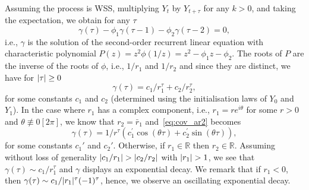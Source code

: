 \documentclass[11pt]{article}
\DeclarePairedDelimiter\abs{|}{|}
\begin{document}
\begin{solution}  %
Assuming the process is WSS, multiplying $Y_t$ by $Y_{t+\tau}$ for any $k>0$, and taking the expectation, we obtain for any $\tau$
%
\begin{equation}
    \gamma(\tau)-\phi_1\gamma(\tau-1)-\phi_2\gamma(\tau-2) = 0,
\end{equation}
%
i.e., $\gamma$ is the solution of the second-order recurrent linear equation with characteristic polynomial $P(z) = z^2\phi(1/z) = z^2-\phi_1z-\phi_2$. The roots of $P$ are the inverse of the roots of $\phi$, i.e., $1/r_1$ and $1/r_2$ and since they are distinct, we have for $\abs{\tau}\geq 0$
%
\begin{equation}
\label{eq:cov_ar2}
    \gamma(\tau) = c_1/r_1^\tau  + c_2/r_2^\tau,
\end{equation}
%
for some constants $c_1$ and $c_2$ (determined using the initialisation laws of $Y_0$ and $Y_1$). In the case where $r_1$ has a complex component, i.e., $r_1 = r e^{i \theta}$ for some $r>0$ and $\theta \not\equiv 0 [2\pi]$, we know that $r_2 = \bar{r}_1$ and~\eqref{eq:cov_ar2} becomes
%
\begin{equation}
    \gamma(\tau) = 1/r^\tau (c_1^{'} \cos(\theta \tau) + c_2^{'} \sin(\theta \tau)),
\end{equation}
%
for some constants $c_1'$ and $c_2'$. Otherwise, if $r_1 \in \mathbb{R}$ then $r_2\in \mathbb{R}$. Assuming without loss of generality $\abs{c_1/r_1}>\abs{c_2/r_2}$ with $\abs{r_1}>1$, we see that $\gamma(\tau)\sim c_1 /r_1^{\tau}$ and $\gamma$ displays an exponential decay. We remark that if $r_1<0$, then $\gamma(\tau) \sim c_1/\abs{r_1}^{\tau} (-1)^{\tau}$, hence, we observe an oscillating exponential decay.


\end{solution}
\end{document}
